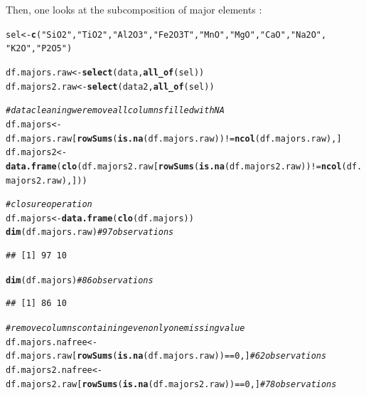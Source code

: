 \documentclass[a4paper,oneside,12pt,titlepage]{article}\usepackage[]{graphicx}\usepackage[]{color}
\makeatletter
\newcommand{\hlnum}[1]{\textcolor[rgb]{0.686,0.059,0.569}{#1}}%
\newcommand{\hlstr}[1]{\textcolor[rgb]{0.192,0.494,0.8}{#1}}%
\newcommand{\hlcom}[1]{\textcolor[rgb]{0.678,0.584,0.686}{\textit{#1}}}%
\newcommand{\hlopt}[1]{\textcolor[rgb]{0,0,0}{#1}}%
\newcommand{\hlstd}[1]{\textcolor[rgb]{0.345,0.345,0.345}{#1}}%
\newcommand{\hlkwb}[1]{\textcolor[rgb]{0.69,0.353,0.396}{#1}}%
\newcommand{\hlkwd}[1]{\textcolor[rgb]{0.737,0.353,0.396}{\textbf{#1}}}%
\newenvironment{kframe}{%
 \def\at@end@of@kframe{}%
 \ifinner\ifhmode%
  \def\at@end@of@kframe{\end{minipage}}%
  \begin{minipage}{\columnwidth}%
 \fi\fi%
 \def\FrameCommand##1{\hskip\@totalleftmargin \hskip-\fboxsep
 \colorbox{shadecolor}{##1}\hskip-\fboxsep
     \hskip-\linewidth \hskip-\@totalleftmargin \hskip\columnwidth}%
 \MakeFramed {\advance\hsize-\width
   \@totalleftmargin\z@ \linewidth\hsize
   \@setminipage}}%
 {\par\unskip\endMakeFramed%
 \at@end@of@kframe}
\newenvironment{knitrout}{}{} %
\makeatother
\begin{document}
Then, one looks at the subcomposition of major elements :
\begin{knitrout}
\color{fgcolor}\begin{kframe}
\begin{alltt}
\hlstd{sel} \hlkwb{<-}\hlkwd{c}\hlstd{(}\hlstr{"SiO2"}\hlstd{,}\hlstr{"TiO2"}\hlstd{,}\hlstr{"Al2O3"}\hlstd{,}\hlstr{"Fe2O3T"}\hlstd{,}\hlstr{"MnO"}\hlstd{,}\hlstr{"MgO"}\hlstd{,}\hlstr{"CaO"}\hlstd{,}\hlstr{"Na2O"}\hlstd{,}
        \hlstr{"K2O"}\hlstd{,}\hlstr{"P2O5"}\hlstd{)}

\hlstd{df.majors.raw} \hlkwb{<-} \hlkwd{select}\hlstd{(data,}\hlkwd{all_of}\hlstd{(sel))}
\hlstd{df.majors2.raw} \hlkwb{<-} \hlkwd{select}\hlstd{(data2,}\hlkwd{all_of}\hlstd{(sel))}

\hlcom{# data cleaning we remove all columns filled with NA}
\hlstd{df.majors} \hlkwb{<-} \hlstd{df.majors.raw[}\hlkwd{rowSums}\hlstd{(}\hlkwd{is.na}\hlstd{(df.majors.raw))} \hlopt{!=} \hlkwd{ncol}\hlstd{(df.majors.raw),]}
\hlstd{df.majors2} \hlkwb{<-} \hlkwd{data.frame}\hlstd{(}\hlkwd{clo}\hlstd{(df.majors2.raw[}\hlkwd{rowSums}\hlstd{(}\hlkwd{is.na}\hlstd{(df.majors2.raw))} \hlopt{!=} \hlkwd{ncol}\hlstd{(df.majors2.raw),]))}

\hlcom{# closure operation}
\hlstd{df.majors} \hlkwb{<-} \hlkwd{data.frame}\hlstd{(}\hlkwd{clo}\hlstd{(df.majors))}
\hlkwd{dim}\hlstd{(df.majors.raw)} \hlcom{# 97 observations}
\end{alltt}
\begin{verbatim}
## [1] 97 10
\end{verbatim}
\begin{alltt}
\hlkwd{dim}\hlstd{(df.majors)} \hlcom{# 86 observations}
\end{alltt}
\begin{verbatim}
## [1] 86 10
\end{verbatim}
\begin{alltt}
\hlcom{# remove columns containing even only one missing value}
\hlstd{df.majors.nafree} \hlkwb{<-} \hlstd{df.majors.raw[}\hlkwd{rowSums}\hlstd{(}\hlkwd{is.na}\hlstd{(df.majors.raw))} \hlopt{==} \hlnum{0}\hlstd{,]} \hlcom{# 62 observations}
\hlstd{df.majors2.nafree} \hlkwb{<-} \hlstd{df.majors2.raw[}\hlkwd{rowSums}\hlstd{(}\hlkwd{is.na}\hlstd{(df.majors2.raw))} \hlopt{==} \hlnum{0}\hlstd{,]} \hlcom{# 78 observations}
\end{alltt}
\end{kframe}
\end{knitrout}
\end{document}
